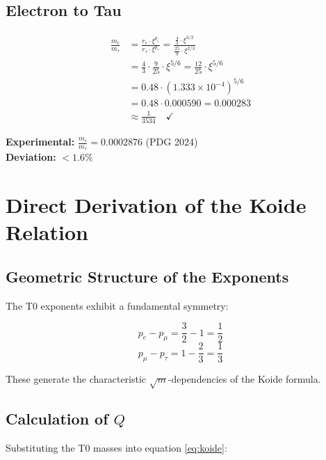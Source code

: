 	\subsection{Electron to Tau}
	
	\begin{beweis}
		\begin{align}
			\frac{m_e}{m_\tau} &= \frac{r_e \cdot \xi^{p_e}}{r_\tau \cdot \xi^{p_\tau}} = \frac{\frac{4}{3} \cdot \xi^{3/2}}{\frac{25}{9} \cdot \xi^{2/3}} \\
			&= \frac{4}{3} \cdot \frac{9}{25} \cdot \xi^{5/6} = \frac{12}{25} \cdot \xi^{5/6} \\
			&= 0.48 \cdot (1.333 \times 10^{-4})^{5/6} \\
			&= 0.48 \cdot 0.000590 = 0.000283 \\
			&\approx \frac{1}{3534} \quad \checkmark
		\end{align}
		
		\textbf{Experimental:} $\frac{m_e}{m_\tau} = 0.0002876$ (PDG 2024)\\
		\textbf{Deviation:} $< 1.6\%$
	\end{beweis}
	
	\section{Direct Derivation of the Koide Relation}
	
	\subsection{Geometric Structure of the Exponents}
	
	The T0 exponents exhibit a fundamental symmetry:
	
	\begin{equation}
		p_e - p_\mu = \frac{3}{2} - 1 = \frac{1}{2}
	\end{equation}
	\begin{equation}
		p_\mu - p_\tau = 1 - \frac{2}{3} = \frac{1}{3}
	\end{equation}
	
	These generate the characteristic $\sqrt{m}$-dependencies of the Koide formula.
	
	\subsection{Calculation of $Q$}
	
	Substituting the T0 masses into equation \eqref{eq:koide}:
	
